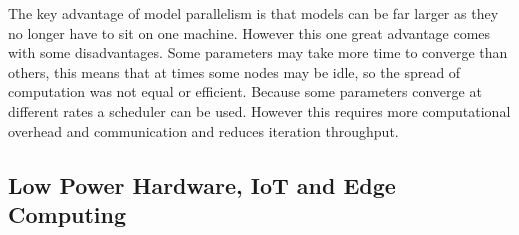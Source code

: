 The key advantage of model parallelism is that models can be far larger as they
no longer have to sit on one machine. However this one great advantage comes
with some disadvantages. Some parameters may take more time to converge than
others, this means that at times some nodes may be idle, so the spread of
computation was not equal or efficient. \cite{Dean2012Distbelief} Because some
parameters converge at different rates a scheduler can be used. However this
requires more computational overhead and communication and reduces iteration
throughput. \cite{kim2016STRADS}

\subsection{Low Power Hardware, IoT and Edge Computing}
